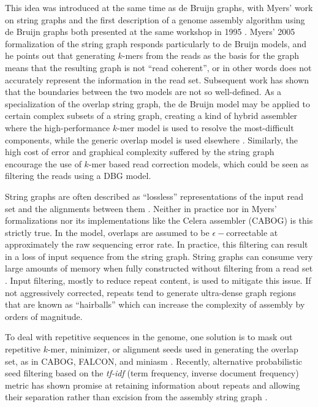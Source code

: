 This idea was introduced at the same time as de Bruijn graphs, with Myers' work on string graphs and the first description of a genome assembly algorithm using de Bruijn graphs both presented at the same workshop in 1995 \cite{myers1995toward,idury1995new}.
Myers' 2005 formalization of the string graph \cite{myers2005} responds particularly to de Bruijn models, and he points out that generating $k$-mers from the reads as the basis for the graph means that the resulting graph is not ``read coherent'', or in other words does not accurately represent the information in the read set.
Subsequent work has shown that the boundaries between the two models are not so well-defined.
As a specialization of the overlap string graph, the de Bruijn model may be applied to certain complex subsets of a string graph, creating a kind of hybrid assembler where the high-performance $k$-mer model is used to resolve the most-difficult components, while the generic overlap model is used elsewhere \cite{huang2016integration}.
Similarly, the high cost of error and graphical complexity suffered by the string graph encourage the use of $k$-mer based read correction models, which could be seen as filtering the reads using a DBG model.

String graphs are often described as ``lossless'' representations of the input read set and the alignments between them \cite{li2012exploring}.
Neither in practice nor in Myers' formalizations nor its implementations like the Celera assembler (CABOG) \cite{miller2008aggressive} is this strictly true.
In the model, overlaps are assumed to be $\epsilon-$correctable at approximately the raw sequencing error rate.
In practice, this filtering can result in a loss of input sequence from the string graph.
String graphs can consume very large amounts of memory when fully constructed without filtering from a read set \cite{li2016minimap,koren2017canu}.
Input filtering, mostly to reduce repeat content, is used to mitigate this issue.
If not aggressively corrected, repeats tend to generate ultra-dense graph regions that are known as ``hairballs'' which can increase the complexity of assembly by orders of magnitude.

To deal with repetitive sequences in the genome, one solution is to mask out repetitive $k$-mer, minimizer, or alignment seeds used in generating the overlap set, as in CABOG, FALCON, and miniasm \cite{miller2008aggressive,chin2016phased,li2016minimap}.
Recently, alternative probabilistic seed filtering based on the \emph{tf-idf} (term frequency, inverse document frequency) metric has shown promise at retaining information about repeats and allowing their separation rather than excision from the assembly string graph \cite{koren2017canu}.


